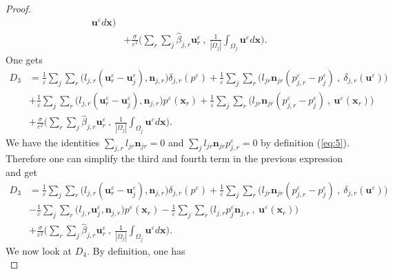 \documentclass[a4paper,french,english,10pt]{article}
\newcommand\ljr{l_{jr}}
\newcommand\njr{\mathbf{n}_{jr}}
\newcommand\uu{\mathbf{u}}
\newcommand\eps{\varepsilon}
\newcommand\x{\mathbf{x}}
\begin{document}
\begin{proof}
\begin{equation*}
\begin{array}{ll}
\uu^{\eps} d\x \bigg) \\
& +\frac{\sigma}{\eps^2} \bigg( \sum_r \sum_j\widehat{\beta}_{j,r}\textbf{u}_r^{\eps} 
\: , \: \frac{1}{|\Omega_j|}\int_{\Omega_j} \uu^{\eps} d\x \bigg) .
\end{array}
\end{equation*}
One gets
\begin{equation*}
\begin{aligned}
D_3 &=\frac{1}{\eps} \sum_j \sum_r \bigg(
l_{j,r}(\textbf{u}_r^{\eps}-\textbf{u}_j^{\eps}),\textbf{n}_{j,r} \bigg)
\delta_{j,r}(p^{\eps})+\frac{1}{\eps} \sum_j \sum_r \bigg( 
l_{jr} \mathbf n_{jr} (p_{j,r}^{\eps}
-
p_j^{\eps}) \: ,
\:\delta_{j,r}(\uu^{\eps}) \bigg) \\
&+ \frac{1}{\eps} \sum_j \sum_r \bigg(
l_{j,r}(\textbf{u}_r^{\eps}-\textbf{u}_j^{\eps}),\textbf{n}_{j,r} \bigg)
p^{\eps}(\x_r)+ \frac{1}{\eps} \sum_j \sum_r \bigg(  
l_{jr} \mathbf n_{jr} (p_{j,r}^{\eps}
-
p_j^{\eps})  \: , \:  \uu^{\eps}(\textbf{x}_{r}) \bigg) \\
&+\frac{\sigma}{\eps^2} \bigg( \sum_r \sum_j
\widehat{\beta}_{j,r}\textbf{u}_r^{\eps}  \: , \:
\frac{1}{|\Omega_j|}\int_{\Omega_j} \uu^{\eps} d\x \bigg) .
\end{aligned}
\end{equation*}
We have the identities $\sum_{j,r}\ljr \njr 
=0$
and  $\sum_j  l_{jr} \mathbf n_{jr} p_{j,r}^{\eps}=0$ by definition
(\ref{eq:5}).
Therefore one can simplify the third and fourth term
in the previous expression and get 
\begin{equation*}
\begin{aligned}
D_3  & =  \frac{1}{\eps} \sum_j \sum_r \bigg(
l_{j,r}(\textbf{u}_r^{\eps}-\textbf{u}_j^{\eps}),\textbf{n}_{j,r} \bigg)
\delta_{j,r}(p^{\eps})+\frac{1}{\eps} \sum_j \sum_r \bigg( 
l_{jr} \mathbf n_{jr} (p_{j,r}^{\eps}
-
p_j^{\eps}) \: , \:
\delta_{j,r}(\uu^{\eps}) \bigg) \\
& - \frac{1}{\eps} \sum_j \sum_r \bigg(
l_{j,r}\textbf{u}_j^{\eps},\textbf{n}_{j,r} \bigg) p^{\eps}(\x_r)- \frac{1}{\eps}
\sum_j \sum_r \bigg( l_{j,r}p_j^{\eps}\textbf{n}_{j,r} \: ,\:
\uu^{\eps}(\textbf{x}_{r}) \bigg)\\
 & + \frac{\sigma}{\eps^2} \bigg( \sum_r
\sum_j\widehat{\beta}_{j,r}\textbf{u}_r^{\eps}  \: , \:
\frac{1}{|\Omega_j|}\int_{\Omega_j} \uu^{\eps} d\x \bigg) .
\end{aligned}
\end{equation*}
We now look at $D_4$. By definition, one has
\begin{equation*}

\end{equation*}
\end{proof}
\end{document}
